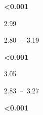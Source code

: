\documentclass[
  letterpaper,
  DIV=11,
  numbers=noendperiod]{scrartcl}
\begin{document}
\begin{table}
\begin{minipage}[t]{\linewidth}
{\textbf{\textless0.001}

}

\end{minipage}%
\newline
\begin{minipage}[t]{\linewidth}

{\centering 

2.99

}

\end{minipage}%
\newline
\begin{minipage}[t]{\linewidth}

{\centering 

2.80~--~3.19

}

\end{minipage}%
\newline
\begin{minipage}[t]{\linewidth}

{\centering 

\textbf{\textless0.001}

}

\end{minipage}%
\newline
\begin{minipage}[t]{\linewidth}

{\centering 

3.05

}

\end{minipage}%
\newline
\begin{minipage}[t]{\linewidth}

{\centering 

2.83~--~3.27

}

\end{minipage}%
\newline
\begin{minipage}[t]{\linewidth}

{\centering 

\textbf{\textless0.001}

}

\end{minipage}%
\newline
\begin{minipage}[t]{\linewidth}

{\centering 

}
\end{minipage}
\end{table}
\end{document}
